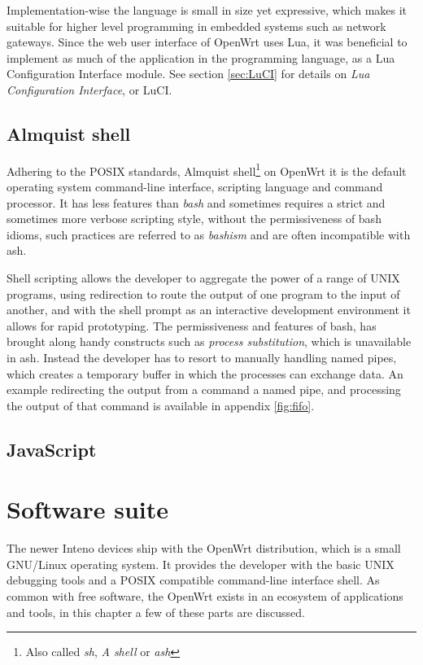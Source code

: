 \documentclass[a4paper,11pt,makeidx]{kth-bcs}
\begin{document}
Implementation-wise the language is small in size yet expressive, which makes it suitable for higher level programming in embedded systems such as network gateways.
Since the web user interface of OpenWrt uses Lua, it was beneficial to implement as much of the application in the programming language, as a Lua Configuration Interface module.
See section \ref{sec:LuCI} for details on \emph{Lua Configuration Interface}, or LuCI.

\subsection{Almquist shell}
Adhering to the POSIX standards, Almquist shell\footnote{Also called \emph{sh}, \emph{A shell} or \emph{ash}} on OpenWrt it is the default operating system command-line interface, scripting language and command processor.
It has less features than \emph{bash} and sometimes requires a strict and sometimes more verbose scripting style, without the permissiveness of bash idioms, such practices are referred to as \emph{bashism} and are often incompatible with ash.

Shell scripting allows the developer to aggregate the power of a range of UNIX programs, using redirection to route the output of one program to the input of another, and with the shell prompt as an interactive development environment it allows for rapid prototyping.
The permissiveness and features of bash, has brought along handy constructs such as \emph{process substitution}, which is unavailable in ash.
Instead the developer has to resort to manually handling named pipes, which creates a temporary buffer in which the processes can exchange data.
An example redirecting the output from a command a named pipe, and processing the output of that command is available in appendix \ref{fig:fifo}.

\subsection{JavaScript}

\section{Software suite}

The newer Inteno devices ship with the OpenWrt distribution, which is a small GNU/Linux operating system.
It provides the developer with the basic UNIX debugging tools and a POSIX compatible command-line interface shell.
As common with free software, the OpenWrt exists in an ecosystem of applications and tools, in this chapter a few of these parts are discussed.
\end{document}
